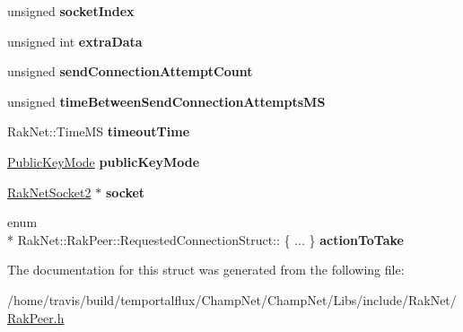 \begin{DoxyCompactItemize}
\item 
\hypertarget{struct_rak_net_1_1_rak_peer_1_1_requested_connection_struct_a4f0cf9eb6d8829f84b81bd84dc91ee08}{unsigned {\bfseries socket\-Index}}\label{struct_rak_net_1_1_rak_peer_1_1_requested_connection_struct_a4f0cf9eb6d8829f84b81bd84dc91ee08}

\item 
\hypertarget{struct_rak_net_1_1_rak_peer_1_1_requested_connection_struct_aff8660e51f08e09550360c4ad470165c}{unsigned int {\bfseries extra\-Data}}\label{struct_rak_net_1_1_rak_peer_1_1_requested_connection_struct_aff8660e51f08e09550360c4ad470165c}

\item 
\hypertarget{struct_rak_net_1_1_rak_peer_1_1_requested_connection_struct_ab30025bd5c1a960d32f706d506c67dde}{unsigned {\bfseries send\-Connection\-Attempt\-Count}}\label{struct_rak_net_1_1_rak_peer_1_1_requested_connection_struct_ab30025bd5c1a960d32f706d506c67dde}

\item 
\hypertarget{struct_rak_net_1_1_rak_peer_1_1_requested_connection_struct_a2fb780f6b2561c1fdeef123d45660207}{unsigned {\bfseries time\-Between\-Send\-Connection\-Attempts\-M\-S}}\label{struct_rak_net_1_1_rak_peer_1_1_requested_connection_struct_a2fb780f6b2561c1fdeef123d45660207}

\item 
\hypertarget{struct_rak_net_1_1_rak_peer_1_1_requested_connection_struct_afbd0d4c6116a6527cda9146574f8d62c}{Rak\-Net\-::\-Time\-M\-S {\bfseries timeout\-Time}}\label{struct_rak_net_1_1_rak_peer_1_1_requested_connection_struct_afbd0d4c6116a6527cda9146574f8d62c}

\item 
\hypertarget{struct_rak_net_1_1_rak_peer_1_1_requested_connection_struct_ab384b07f9ca8a1b9a220f47423136926}{\hyperlink{namespace_rak_net_a415b479158fd361610df230a53b35b02}{Public\-Key\-Mode} {\bfseries public\-Key\-Mode}}\label{struct_rak_net_1_1_rak_peer_1_1_requested_connection_struct_ab384b07f9ca8a1b9a220f47423136926}

\item 
\hypertarget{struct_rak_net_1_1_rak_peer_1_1_requested_connection_struct_a6b72194721916b7aaa3ec8a6e9170eb5}{\hyperlink{class_rak_net_1_1_rak_net_socket2}{Rak\-Net\-Socket2} $\ast$ {\bfseries socket}}\label{struct_rak_net_1_1_rak_peer_1_1_requested_connection_struct_a6b72194721916b7aaa3ec8a6e9170eb5}

\item 
\hypertarget{struct_rak_net_1_1_rak_peer_1_1_requested_connection_struct_a6bf729aef46c9f86054e5f9b94abd106}{enum \\*
Rak\-Net\-::\-Rak\-Peer\-::\-Requested\-Connection\-Struct\-:: \{ ... \}  {\bfseries action\-To\-Take}}\label{struct_rak_net_1_1_rak_peer_1_1_requested_connection_struct_a6bf729aef46c9f86054e5f9b94abd106}

\end{DoxyCompactItemize}


The documentation for this struct was generated from the following file\-:\begin{DoxyCompactItemize}
\item 
/home/travis/build/temportalflux/\-Champ\-Net/\-Champ\-Net/\-Libs/include/\-Rak\-Net/\hyperlink{_rak_peer_8h}{Rak\-Peer.\-h}\end{DoxyCompactItemize}

